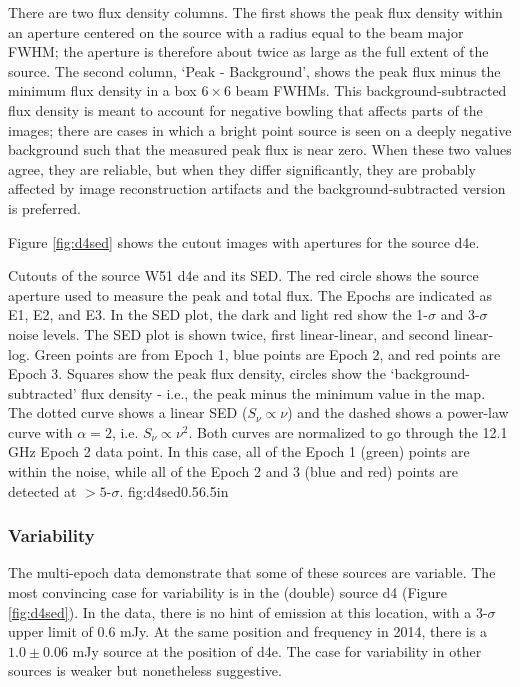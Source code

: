 There are two flux density columns.  The first shows the peak flux density
within an aperture centered on the source with a radius equal to the beam major
FWHM; the aperture is therefore about twice as large as the full extent of the
source.  The second column, `Peak - Background', shows the peak flux minus the
minimum flux density in a box $6\times6$ beam FWHMs.  This
background-subtracted flux density is meant to account for negative bowling
that affects parts of the images; there are cases in which a bright point
source is seen on a deeply negative background such that the measured peak flux
is near zero.  When these two values agree, they are reliable, but when they
differ significantly, they are probably affected by image reconstruction
artifacts and the background-subtracted version is preferred.



Figure \ref{fig:d4sed} shows the cutout images with apertures for the source
d4e.  

{Cutouts of the source W51 d4e and its SED.
The red circle shows the source aperture used to measure the peak and total
flux.  The Epochs are indicated as E1, E2, and E3.
In the SED plot, the dark and light red show the 1-$\sigma$ and 3-$\sigma$
noise levels.  The SED plot is shown twice, first linear-linear, and second
linear-log.
Green points are from Epoch 1, blue points are Epoch 2, and red points are
Epoch 3.  Squares show the peak flux density, circles show the
`background-subtracted' flux density - i.e., the peak minus the minimum value
in the map.
The dotted curve shows a linear SED ($S_\nu \propto \nu$) and the dashed shows
a power-law curve with $\alpha=2$, i.e. $S_\nu \propto \nu^2$.  Both curves are
normalized to go through the 12.1 GHz Epoch 2 data point.  In this case, all of
the Epoch 1 (green) points are within the noise, while all of the Epoch 2 and 3
(blue and red) points are detected at $>5$-$\sigma$.
}
{fig:d4sed}{0.5}{6.5in}

\subsubsection{Variability}
\label{sec:variability}
The multi-epoch data demonstrate that some of these sources are variable.  The
most convincing case for variability is in the (double) source d4 (Figure
\ref{fig:d4sed}).  In the \citet{Mehringer1994a} data, there is no hint of
emission at this location, with a 3-$\sigma$ upper limit of 0.6 mJy.  At the
same position and frequency in 2014, there is a $1.0 \pm 0.06$ mJy source at
the position of d4e.  The case for variability in other sources is weaker but
nonetheless suggestive.

